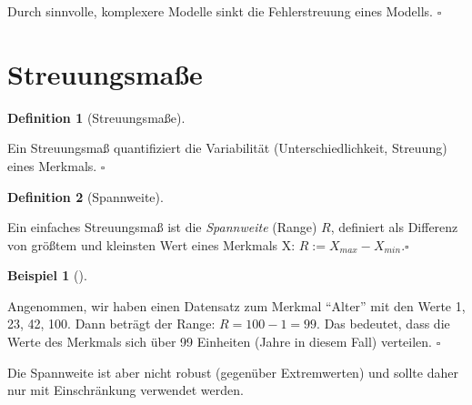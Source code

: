\documentclass[
  letterpaper,
  twoside,
  open=any]{scrbook}
\theoremstyle{definition}
\newtheorem{definition}{Definition}[chapter]
\theoremstyle{definition}
\theoremstyle{definition}
\newtheorem{example}{Beispiel}[chapter]
\theoremstyle{remark}
\begin{document}
\begin{tcolorbox}[enhanced jigsaw, colbacktitle=quarto-callout-important-color!10!white, colframe=quarto-callout-important-color-frame, coltitle=black, arc=.35mm, breakable, opacitybacktitle=0.6, toprule=.15mm, colback=white, rightrule=.15mm, opacityback=0, toptitle=1mm, title=\textcolor{quarto-callout-important-color}{\faExclamation}\hspace{0.5em}{Wichtig}, titlerule=0mm, bottomtitle=1mm, bottomrule=.15mm, leftrule=.75mm, left=2mm]

Durch sinnvolle, komplexere Modelle sinkt die Fehlerstreuung eines
Modells. \(\square\)

\end{tcolorbox}

\section{Streuungsmaße}\label{sec-streuung}

\begin{definition}[Streuungsmaße]\protect\hypertarget{def-streuungsmaße}{}\label{def-streuungsmaße}

Ein Streuungsmaß quantifiziert die Variabilität (Unterschiedlichkeit,
Streuung) eines Merkmals. \(\square\)

\end{definition}

\begin{definition}[Spannweite]\protect\hypertarget{def-range}{}\label{def-range}

Ein einfaches Streuungsmaß ist die \emph{Spannweite} (Range) \(R\),
definiert als Differenz von größtem und kleinsten Wert eines Merkmals X:
\(R := X_{max} - X_{min}. \square\)

\end{definition}

\begin{example}[]\protect\hypertarget{exm-range}{}\label{exm-range}

Angenommen, wir haben einen Datensatz zum Merkmal \enquote{Alter} mit
den Werte 1, 23, 42, 100. Dann beträgt der Range: \(R = 100 - 1 = 99\).
Das bedeutet, dass die Werte des Merkmals sich über 99 Einheiten (Jahre
in diesem Fall) verteilen. \(\square\)

\end{example}

Die Spannweite ist aber nicht robust (gegenüber Extremwerten) und sollte
daher nur mit Einschränkung verwendet werden.
\end{document}
